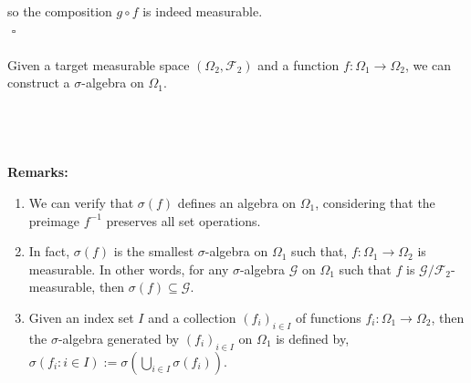 \documentclass{article}
\begin{document}
so the composition $g \circ f$ is indeed measurable. \\ ${}$ \hfill $\square$ \\\\
Given a target measurable space $(\Omega_2, \mathcal{F}_2)$ and a function $f: \Omega_1 \to \Omega_2$, we can construct a $\sigma$-algebra on $\Omega_1$.\\\\
\noindent{}\\\\\\
\textbf{Remarks:}
\begin{enumerate}
	\item We can verify that $\sigma(f)$ defines an algebra on $\Omega_1$, considering that the preimage $f^{-1}$ preserves all set operations.
	\item In fact, $\sigma(f)$ is the smallest $\sigma$-algebra on $\Omega_1$ such that, $f: \Omega_1 \to \Omega_2$ is measurable. In other words, for any $\sigma$-algebra $\mathcal{G}$ on $\Omega_1$ such that $f$ is $\mathcal{G}/\mathcal{F}_2$-measurable, then $\sigma(f) \subseteq \mathcal{G}$.
	\item Given an index set $I$ and a collection $(f_i)_{i \in I}$ of functions $f_i : \Omega_1 \to \Omega_2$, then the $\sigma$-algebra generated by $(f_i)_{i \in I}$ on $\Omega_1$ is defined by, $\sigma(f_i: i \in I) := \sigma(\bigcup_{i \in I}\sigma(f_i))$.
\end{enumerate}
\noindent{}\\\\\\
\end{document}
